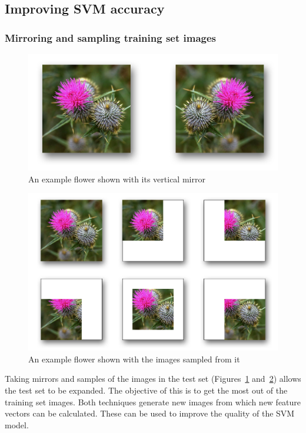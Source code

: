 \documentclass[11pt, a4paper]{report}
\begin{document}
\subsection{Improving SVM accuracy}

\subsubsection{Mirroring and sampling training set images}

\begin{figure}[hbt]
	\centering
  \includegraphics[totalheight=4cm]{img/09.png}
  \caption{An example flower shown with its vertical mirror}
  \label{img:09}
\end{figure}

\begin{figure}[hbt]
	\centering
  \includegraphics[totalheight=8cm]{img/10.png}
  \caption{An example flower shown with the images sampled from it}
  \label{img:10}
\end{figure}

Taking mirrors and samples of the images in the test set (Figures~\ref{img:09} and~\ref{img:10}) allows the test set to be expanded. The objective of this is to get the most out of the training set images. Both techniques generate new images from which new feature vectors can be calculated. These can be used to improve the quality of the SVM model. 
\end{document}

